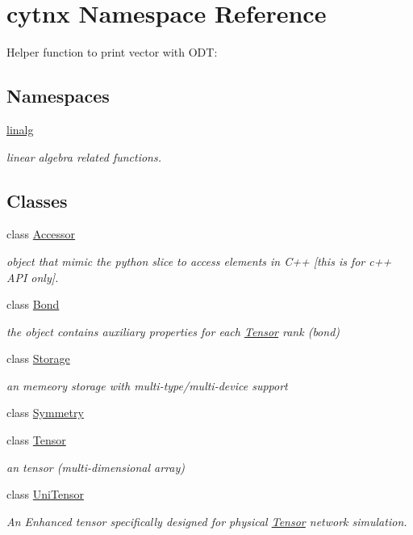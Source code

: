 \hypertarget{namespacecytnx}{}\section{cytnx Namespace Reference}
\label{namespacecytnx}


Helper function to print vector with O\+DT\+:  


\subsection*{Namespaces}
\begin{DoxyCompactItemize}
\item 
 \hyperlink{namespacecytnx_1_1linalg}{linalg}
\begin{DoxyCompactList}\small\item\em linear algebra related functions. \end{DoxyCompactList}\end{DoxyCompactItemize}
\subsection*{Classes}
\begin{DoxyCompactItemize}
\item 
class \hyperlink{classcytnx_1_1Accessor}{Accessor}
\begin{DoxyCompactList}\small\item\em object that mimic the python slice to access elements in C++ \mbox{[}this is for c++ A\+PI only\mbox{]}. \end{DoxyCompactList}\item 
class \hyperlink{classcytnx_1_1Bond}{Bond}
\begin{DoxyCompactList}\small\item\em the object contains auxiliary properties for each \hyperlink{classcytnx_1_1Tensor}{Tensor} rank (bond) \end{DoxyCompactList}\item 
class \hyperlink{classcytnx_1_1Storage}{Storage}
\begin{DoxyCompactList}\small\item\em an memeory storage with multi-\/type/multi-\/device support \end{DoxyCompactList}\item 
class \hyperlink{classcytnx_1_1Symmetry}{Symmetry}
\item 
class \hyperlink{classcytnx_1_1Tensor}{Tensor}
\begin{DoxyCompactList}\small\item\em an tensor (multi-\/dimensional array) \end{DoxyCompactList}\item 
class \hyperlink{classcytnx_1_1UniTensor}{Uni\+Tensor}
\begin{DoxyCompactList}\small\item\em An Enhanced tensor specifically designed for physical \hyperlink{classcytnx_1_1Tensor}{Tensor} network simulation. \end{DoxyCompactList}\end{DoxyCompactItemize}
